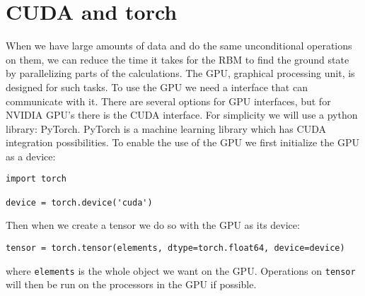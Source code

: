 \section{CUDA and torch}

When we have large amounts of data and do the same unconditional operations on them, we can reduce the time it takes for the RBM to find the ground state by parallelizing parts of the calculations. The GPU, graphical processing unit, is designed for such tasks. To use the GPU we need a interface that can communicate with it. There are several options for GPU interfaces, but for NVIDIA\cite{NVIDIA} GPU's there is the CUDA\cite{cuda} interface. For simplicity we will use a python library: PyTorch\cite{paszke2019pytorch}. PyTorch is a machine learning library which has CUDA integration possibilities. To enable the use of the GPU we first initialize the GPU as a device:

\begin{verbatim}
import torch

device = torch.device('cuda')
\end{verbatim}

Then when we create a tensor we do so with the GPU as its device:

\begin{verbatim}
tensor = torch.tensor(elements, dtype=torch.float64, device=device)
\end{verbatim}

where \texttt{elements} is the whole object we want on the GPU. Operations on \texttt{tensor} will then be run on the processors in the GPU if possible.
